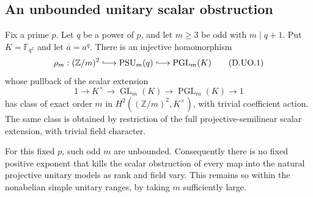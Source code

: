 \subsection{An unbounded unitary scalar obstruction}

\begin{example}
\label{D:unitary-unbounded-scalar-obstruction}
Fix a prime $p$. Let $q$ be a power of $p$, and let
$m\ge3$ be odd with $m\mid q+1$.
Put $K=\mathbb F_{q^2}$ and let $\overline a=a^q$.
There is an injective homomorphism
\[
 \rho_m:(\mathbb Z/m)^2
       \lhook\joinrel\longrightarrow\operatorname{PSU}_m(q)
       \lhook\joinrel\longrightarrow\operatorname{PGL}_m(K)
                                                               \tag{D.UO.1}
\]
whose pullback of the scalar extension
\[
 1\longrightarrow K^\times\longrightarrow
 \operatorname{GL}_m(K)\longrightarrow
 \operatorname{PGL}_m(K)\longrightarrow1
                                                               \tag{D.UO.2}
\]
has class of exact order $m$ in
$H^2((\mathbb Z/m)^2,K^\times)$, with trivial
coefficient action. The same class is obtained by
restriction of the full projective-semilinear scalar
extension, with trivial field character.

For this fixed $p$, such odd $m$ are unbounded.
Consequently there is no fixed positive exponent
that kills the scalar obstruction of every map
into the natural projective unitary models as
rank and field vary. This remains so within the
nonabelian simple unitary ranges, by taking $m$
sufficiently large.
\end{example}

